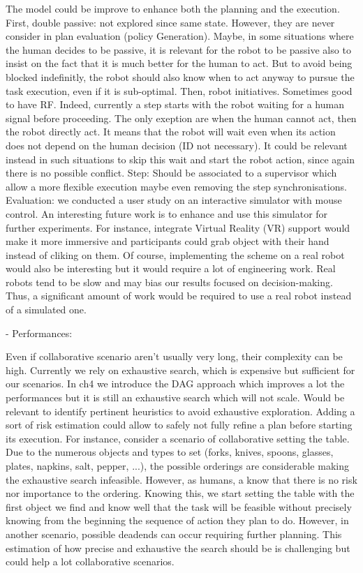 The model could  be improve to enhance both the planning and the execution.
First, double passive: not explored since same state. However, they are never consider in plan evaluation (policy Generation). Maybe, in some situations where the human decides to be passive, it is relevant for the robot to be passive also to insist on the fact that it is much better for the human to act. But to avoid being blocked indefinitly, the robot should also know when to act anyway to pursue the task execution, even if it is sub-optimal.
Then, robot initiatives. Sometimes good to have RF. Indeed, currently a step starts with the robot waiting for a human signal before proceeding. The only exeption are when the human cannot act, then the robot directly act. It means that the robot will wait even when its action does not depend on the human decision (ID not necessary). It could be relevant instead in such situations to skip this wait and start the robot action, since again there is no possible conflict.   
Step: Should be associated to a supervisor which allow a more flexible execution maybe even removing the step synchronisations. 
Evaluation: we conducted a user study on an interactive simulator with mouse control. An interesting future work is to enhance and use this simulator for further experiments. For instance, integrate Virtual Reality (VR) support would make it more immersive and participants could grab object with their hand instead of cliking on them. Of course, implementing the scheme on a real robot would also be interesting but it would require a lot of engineering work. Real robots tend to be slow and may bias our results focused on decision-making. Thus, a significant amount of work would be required to use a real robot instead of a simulated one. 

- Performances:

Even if collaborative scenario aren't usually very long, their complexity can be high. 
Currently we rely on exhaustive search, which is expensive but sufficient for our scenarios. In ch4 we introduce the DAG approach which improves a lot the performances but it is still an exhaustive search which will not scale. 
Would be relevant to identify pertinent heuristics to avoid exhaustive exploration. Adding a sort of risk estimation could allow to safely not fully refine a plan before starting its execution. For instance, consider a scenario of collaborative setting the table. Due to the numerous objects and types to set (forks, knives, spoons, glasses, plates, napkins, salt, pepper, ...), the possible orderings are considerable making the exhaustive search infeasible. However, as humans, a know that there is no risk nor importance to the ordering. Knowing this, we start setting the table with the first object we find and know well that the task will be feasible without precisely knowing from the beginning the sequence of action they plan to do. However, in another scenario, possible deadends can occur requiring further planning. This estimation of how precise and exhaustive the search should be is challenging but could help a lot collaborative scenarios.

